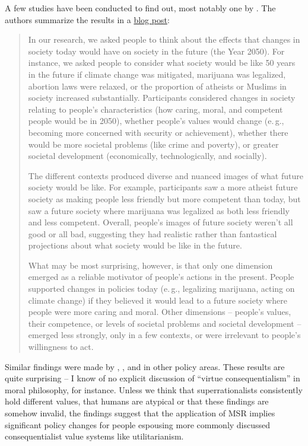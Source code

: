 A few studies have been conducted to find out, most notably one by
\citet{Bain2013-fc}. The authors summarize the results
in a
\href{https://spsptalks.wordpress.com/2013/07/14/the-utopias-of-everyday-people/}{blog
post}:

\begin{quote}
In our research, we asked people to think about the effects that changes
in society today would have on society in the future (the Year 2050).
For instance, we asked people to consider what society would be like 50
years in the future if climate change was mitigated, marijuana was
legalized, abortion laws were relaxed, or the proportion of atheists or
Muslims in society increased substantially. Participants considered
changes in society relating to people's characteristics (how caring,
moral, and competent people would be in 2050), whether people's values
would change (e.\,g., becoming more concerned with security or
achievement), whether there would be more societal problems (like crime
and poverty), or greater societal development (economically,
technologically, and socially).

The different contexts produced diverse and nuanced images of what
future society would be like. For example, participants saw a more
atheist future society as making people less friendly but more competent
than today, but saw a future society where marijuana was legalized as
both less friendly and less competent. Overall, people's images of
future society weren't all good or all bad, suggesting they had
realistic rather than fantastical projections about what society would
be like in the future.

What may be most surprising, however, is that only one dimension emerged
as a reliable motivator of people's actions in the present. People
supported changes in policies today (e.\,g., legalizing marijuana, acting
on climate change) if they believed it would lead to a future society
where people were more caring and moral. Other dimensions -- people's
values, their competence, or levels of societal problems and societal
development -- emerged less strongly, only in a few contexts, or were
irrelevant to people's willingness to act.
\end{quote}

Similar findings were made by \citet{Bain2012-rs},
\citet{Park2015-bj},
\citet{Judge2015-mu} and
\citet{Bain2015-qk} in other policy areas. These results
are quite surprising -- I know of no explicit discussion of ``virtue
consequentialism'' in moral philosophy, for instance. Unless we think
that superrationalists consistently hold different values, that humans
are atypical or that these findings are somehow invalid, the findings
suggest that the application of MSR implies significant policy changes
for people espousing more commonly discussed consequentialist value
systems like utilitarianism.

